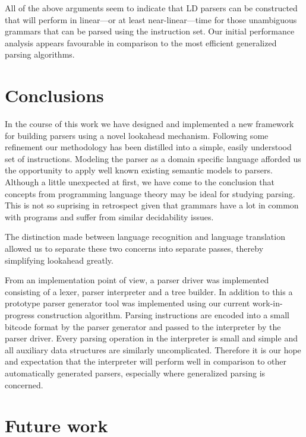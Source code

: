 \documentclass[envcountsame,runningheads]{llncs}
\begin{document}
All of the above arguments seem to indicate that LD parsers can be constructed that will perform in linear---or at least near-linear---time for those unambiguous grammars that can be parsed using the instruction set.
Our initial performance analysis appears favourable in comparison to the most efficient generalized parsing algorithms.

\section{Conclusions}

In the course of this work we have designed and implemented a new framework for building parsers using a novel lookahead mechanism.
Following some refinement our methodology has been distilled into a simple, easily understood set of instructions.
Modeling the parser as a domain specific language afforded us the opportunity to apply well known existing semantic models to parsers.
Although a little unexpected at first, we have come to the conclusion that concepts from programming language theory may be ideal for studying parsing.
This is not so suprising in retrospect given that grammars have a lot in common with programs and suffer from similar decidability issues.

The distinction made between language recognition and language translation allowed us to separate these two concerns into separate passes, 
thereby simplifying lookahead greatly. %

From an implementation point of view, a parser driver was implemented consisting of a lexer, parser interpreter and a tree builder.
In addition to this a prototype parser generator tool was implemented using our current work-in-progress construction algorithm.
Parsing instructions are encoded into a small bitcode format by the parser generator and passed to the interpreter by the parser driver.
Every parsing operation in the interpreter is small and simple and all auxiliary data structures are similarly uncomplicated. 
Therefore it is our hope and expectation that the interpreter will perform well in comparison to other automatically generated parsers, especially where generalized parsing is concerned.

\section{Future work}
\end{document}
